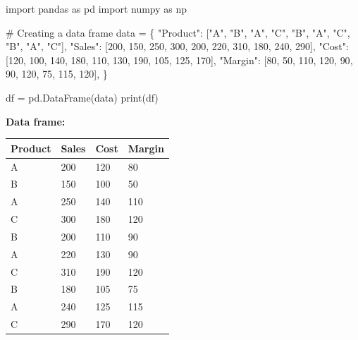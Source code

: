 \documentclass[
  english,
  letterpaper,
  DIV=11,
  numbers=noendperiod]{scrreprt}
\newenvironment{Shaded}{\begin{snugshade}}{\end{snugshade}}
\newcommand{\BuiltInTok}[1]{\textcolor[rgb]{0.00,0.23,0.31}{#1}}
\newcommand{\CommentTok}[1]{\textcolor[rgb]{0.37,0.37,0.37}{#1}}
\newcommand{\DecValTok}[1]{\textcolor[rgb]{0.68,0.00,0.00}{#1}}
\newcommand{\ImportTok}[1]{\textcolor[rgb]{0.00,0.46,0.62}{#1}}
\newcommand{\NormalTok}[1]{\textcolor[rgb]{0.00,0.23,0.31}{#1}}
\newcommand{\OperatorTok}[1]{\textcolor[rgb]{0.37,0.37,0.37}{#1}}
\newcommand{\StringTok}[1]{\textcolor[rgb]{0.13,0.47,0.30}{#1}}
\newcounter{none} %
\begin{document}
\begin{Shaded}
\begin{Highlighting}[]
\ImportTok{import}\NormalTok{ pandas }\ImportTok{as}\NormalTok{ pd}
\ImportTok{import}\NormalTok{ numpy }\ImportTok{as}\NormalTok{ np}

\CommentTok{\# Creating a data frame}
\NormalTok{data }\OperatorTok{=}\NormalTok{ \{}
    \StringTok{"Product"}\NormalTok{: [}\StringTok{"A"}\NormalTok{, }\StringTok{"B"}\NormalTok{, }\StringTok{"A"}\NormalTok{, }\StringTok{"C"}\NormalTok{, }\StringTok{"B"}\NormalTok{, }\StringTok{"A"}\NormalTok{, }\StringTok{"C"}\NormalTok{, }\StringTok{"B"}\NormalTok{, }\StringTok{"A"}\NormalTok{, }\StringTok{"C"}\NormalTok{],}
    \StringTok{"Sales"}\NormalTok{: [}\DecValTok{200}\NormalTok{, }\DecValTok{150}\NormalTok{, }\DecValTok{250}\NormalTok{, }\DecValTok{300}\NormalTok{, }\DecValTok{200}\NormalTok{, }\DecValTok{220}\NormalTok{, }\DecValTok{310}\NormalTok{, }\DecValTok{180}\NormalTok{, }\DecValTok{240}\NormalTok{, }\DecValTok{290}\NormalTok{],}
    \StringTok{"Cost"}\NormalTok{: [}\DecValTok{120}\NormalTok{, }\DecValTok{100}\NormalTok{, }\DecValTok{140}\NormalTok{, }\DecValTok{180}\NormalTok{, }\DecValTok{110}\NormalTok{, }\DecValTok{130}\NormalTok{, }\DecValTok{190}\NormalTok{, }\DecValTok{105}\NormalTok{, }\DecValTok{125}\NormalTok{, }\DecValTok{170}\NormalTok{],}
    \StringTok{"Margin"}\NormalTok{: [}\DecValTok{80}\NormalTok{, }\DecValTok{50}\NormalTok{, }\DecValTok{110}\NormalTok{, }\DecValTok{120}\NormalTok{, }\DecValTok{90}\NormalTok{, }\DecValTok{90}\NormalTok{, }\DecValTok{120}\NormalTok{, }\DecValTok{75}\NormalTok{, }\DecValTok{115}\NormalTok{, }\DecValTok{120}\NormalTok{],}
\NormalTok{\}}

\NormalTok{df }\OperatorTok{=}\NormalTok{ pd.DataFrame(data)}
\BuiltInTok{print}\NormalTok{(df)}
\end{Highlighting}
\end{Shaded}

\textbf{Data frame:}

{\def\LTcaptype{none} %
\begin{longtable}[]{@{}llll@{}}
\toprule\noalign{}
Product & Sales & Cost & Margin \\
\midrule\noalign{}
\endhead
\bottomrule\noalign{}
\endlastfoot
A & 200 & 120 & 80 \\
B & 150 & 100 & 50 \\
A & 250 & 140 & 110 \\
C & 300 & 180 & 120 \\
B & 200 & 110 & 90 \\
A & 220 & 130 & 90 \\
C & 310 & 190 & 120 \\
B & 180 & 105 & 75 \\
A & 240 & 125 & 115 \\
C & 290 & 170 & 120 \\
\end{longtable}
}
\end{document}
